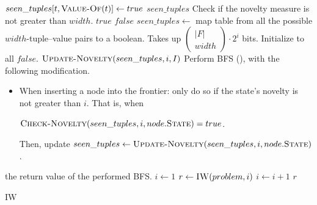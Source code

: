 \begin{algorithm}[hbtp]
\newcommand{\nchoosek}[2]{\left(\begin{array}{c}#1 \\ #2 \end{array}\right)}
\begin{algorithmic}
      \State $seen\_tuples[t, \Call{Value-Of}{t}] \gets true$
    \EndFor
    \State \Return $seen\_tuples$
  \EndFunction
  \State \Comment Check if the novelty measure is not greater than $width$.
       \Return $true$
      \EndIf
    \EndFor
    \State \Return $false$
  \EndFunction
    \State $seen\_tuples \gets$ map table from all the possible
      $width$-tuple--value pairs to a boolean. Takes up $\nchoosek{|F|}{width}\cdot
      2^i$ bits. Initialize to all $false$.
    \State $\Call{Update-Novelty}{seen\_tuples, i, I}$
    \State Perform \ac{BFS} (), with the following modification.
    \begin{itemize}
	  \item[] When inserting a node into the frontier: only do so if the
		  state's novelty is not greater than $i$. That is, when

        $\Call{Check-Novelty}{seen\_tuples, i, node.\textsc{State}} = true$.

        Then, update $seen\_tuples \gets \Call{Update-Novelty}{seen\_tuples, i,
        node.\textsc{State}}$.
    \end{itemize}
    \State \Return the return value of the performed \ac{BFS}.
  \EndFunction
    \State $i \gets 1$
    \Repeat
      \State $r \gets \Call{IW}{problem, i}$
      \State $i \gets i+1$
    \State \Return $r$
  \EndFunction
\end{algorithmic}
\caption{\acl{IW} \citep{lipovetzky2012width}}
\label{alg:iterated-width}
\end{algorithm}


